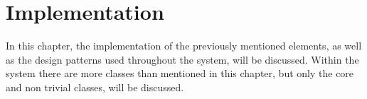 \chapter{Implementation}
In this chapter, the implementation of the previously mentioned elements, as well as the design patterns used throughout the system, will be discussed. Within the system there are more classes than mentioned in this chapter, but only the core and non trivial classes, will be discussed.
\par



